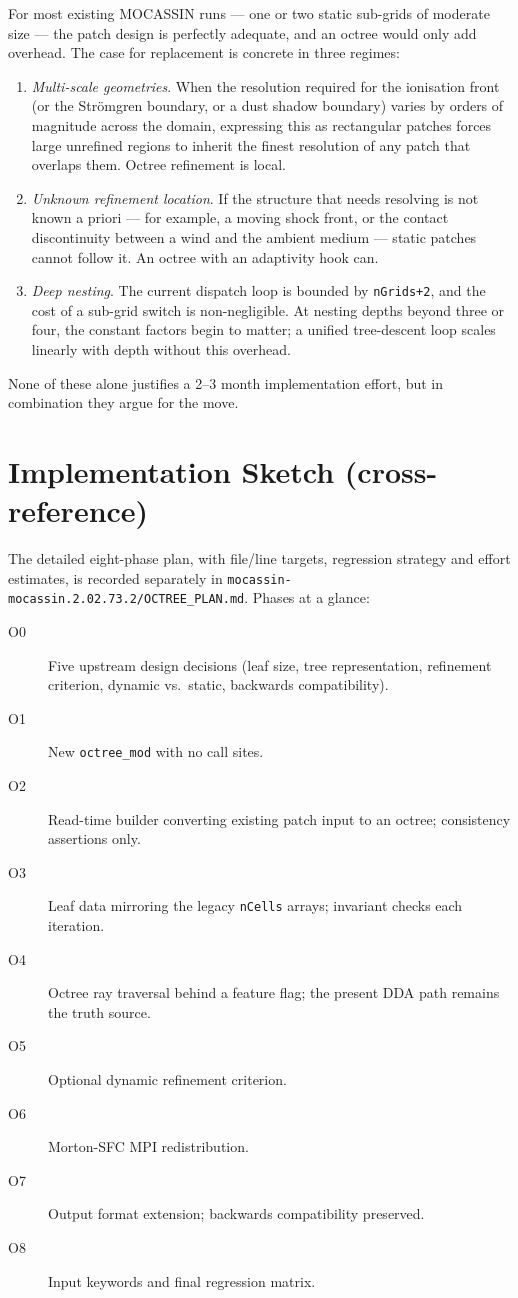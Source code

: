 \documentclass[11pt,a4paper]{my_memo}
\begin{document}
For most existing MOCASSIN runs --- one or two static sub-grids of moderate
size --- the patch design is perfectly adequate, and an octree would only
add overhead.  The case for replacement is concrete in three regimes:
\begin{enumerate}
\item \emph{Multi-scale geometries}.  When the resolution required for the
  ionisation front (or the Str\"omgren boundary, or a dust shadow boundary)
  varies by orders of magnitude across the domain, expressing this as
  rectangular patches forces large unrefined regions to inherit the finest
  resolution of any patch that overlaps them.  Octree refinement is local.
\item \emph{Unknown refinement location}.  If the structure that needs
  resolving is not known a priori --- for example, a moving shock front, or
  the contact discontinuity between a wind and the ambient medium ---
  static patches cannot follow it.  An octree with an adaptivity hook can.
\item \emph{Deep nesting}.  The current dispatch loop is bounded by
  \texttt{nGrids+2}, and the cost of a sub-grid switch is non-negligible.
  At nesting depths beyond three or four, the constant factors begin to
  matter; a unified tree-descent loop scales linearly with depth without
  this overhead.
\end{enumerate}
None of these alone justifies a 2--3 month implementation effort, but in
combination they argue for the move.

\section{Implementation Sketch (cross-reference)}

The detailed eight-phase plan, with file/line targets, regression strategy
and effort estimates, is recorded separately in
\texttt{mocassin-mocassin.2.02.73.2/OCTREE\_PLAN.md}.  Phases at a glance:
\begin{description}
\item[O0] Five upstream design decisions (leaf size, tree representation,
  refinement criterion, dynamic vs.\ static, backwards compatibility).
\item[O1] New \texttt{octree\_mod} with no call sites.
\item[O2] Read-time builder converting existing patch input to an octree;
  consistency assertions only.
\item[O3] Leaf data mirroring the legacy \texttt{nCells} arrays;
  invariant checks each iteration.
\item[O4] Octree ray traversal behind a feature flag; the present DDA path
  remains the truth source.
\item[O5] Optional dynamic refinement criterion.
\item[O6] Morton-SFC MPI redistribution.
\item[O7] Output format extension; backwards compatibility preserved.
\item[O8] Input keywords and final regression matrix.
\end{description}
\end{document}
